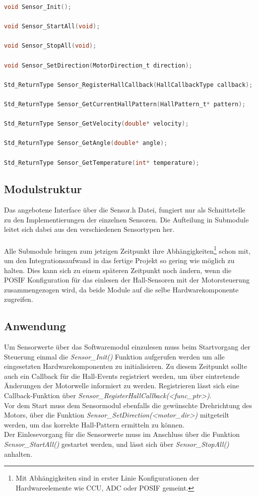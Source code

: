 \begin{lstlisting}[frame=single, language=c, caption=Sensor Interface, label=lst:SensorInterface]
void Sensor_Init();

void Sensor_StartAll(void);

void Sensor_StopAll(void);

void Sensor_SetDirection(MotorDirection_t direction);

Std_ReturnType Sensor_RegisterHallCallback(HallCallbackType callback);

Std_ReturnType Sensor_GetCurrentHallPattern(HallPattern_t* pattern);

Std_ReturnType Sensor_GetVelocity(double* velocity);

Std_ReturnType Sensor_GetAngle(double* angle);

Std_ReturnType Sensor_GetTemperature(int* temperature);
\end{lstlisting}

\subsection{Modulstruktur}
Das angebotene Interface über die Sensor.h Datei, fungiert nur als Schnittstelle zu den Implementierungen der einzelnen Sensoren. Die Aufteilung in Submodule leitet sich dabei aus den verschiedenen Sensortypen her. \\
\noindent \\
Alle Submodule bringen zum jetzigen Zeitpunkt ihre Abhängigkeiten\footnote{Mit Abhängigkeiten sind in erster Linie Konfigurationen der Hardwareelemente wie CCU, ADC oder POSIF gemeint.} schon mit, um den Integrationsaufwand in das fertige Projekt so gering wie möglich zu halten. Dies kann sich zu einem späteren Zeitpunkt noch ändern, wenn die POSIF Konfiguration für das einlesen der Hall-Sensoren mit der Motorsteuerung zusammengezogen wird, da beide Module auf die selbe Hardwarekomponente zugreifen.

\subsection{Anwendung}
Um Sensorwerte über das Softwaremodul einzulesen muss beim Startvorgang der Steuerung einmal die \textit{Sensor\_Init()} Funktion aufgerufen werden um alle eingesetzten Hardwarekomponenten zu initialisieren. Zu diesem Zeitpunkt sollte auch ein Callback für die Hall-Events registriert werden, um über eintretende Änderungen der Motorwelle informiert zu werden. Registrieren lässt sich eine Callback-Funktion über \textit{Sensor\_RegisterHallCallback(<func\_ptr>)}. \\
Vor dem Start muss dem Sensormodul ebenfalls die gewünschte Drehrichtung des Motors, über die Funktion \textit{Sensor\_SetDirection(<motor\_dir>)} mitgeteilt werden, um das korrekte Hall-Pattern ermitteln zu können. \\
Der Einlesevorgang für die Sensorwerte muss im Anschluss über die Funktion \textit{Sensor\_StartAll()} gestartet werden, und lässt sich über \textit{Sensor\_StopAll()} anhalten. \\

